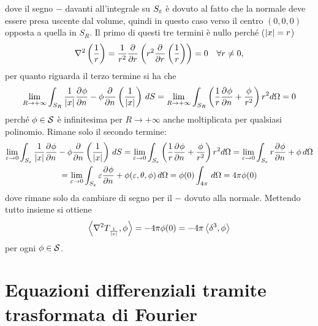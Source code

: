 dove il segno $ - $ davanti all'integrale su $ S_\varepsilon $ è dovuto al fatto che la normale deve essere presa uscente dal volume, quindi in questo caso verso 
il centro $ (0,0,0) $ opposta a quella in $ S_R $. Il primo di questi tre termini è nullo perché ($ \left|{x}\right| = r $)
\begin{align}
  \nabla^2\left( \frac1r \right) = \frac1{r^2} \frac{\partial^{} {}}{\partial {r}^{}} \left( r^2 \frac{\partial^{} {}}{\partial {r}^{}}\left( \frac1r \right)\right) = 0 \quad \forall r \neq 0,
\end{align}
per quanto riguarda il terzo termine si ha che 
\begin{align}
  \lim_{R \to +\infty} \int_{S_R} \frac1{\abs{x}} \der{\phi}{{n}} - \phi \der{}{{n}}\left( \frac1{\abs{x}} \right) \,dS
  =  \lim_{R \to +\infty} \int_{S_R}\left( \frac1r \der{\phi}{{n}} + \frac{\phi}{r^2} \right) r^2 d\Omega = 0
\end{align} 
perché $ \phi \in \S $  è infinitesima per $ R\to+\infty $ anche moltiplicata per qualsiasi polinomio.
Rimane solo il secondo termine:
\begin{gather}
  \lim_{\eps \to 0} \int_{S_\eps} \frac1{\abs{x}} \der{\phi}{{n}} - \phi \der{}{{n}}\left( \frac1{\abs{x}} \right) \,dS
  = \lim_{\eps \to 0} \int_{S_\eps} \left(  \frac1r \der{\phi}{{n}} + \frac{\phi}{r^2} \right) r^2 d\Omega 
  = \lim_{\eps \to 0} \int_{S_\eps} r \der{\phi}{{n}} + \phi\, d\Omega 
  \\
  = \lim_{\eps \to 0} \int_{S_\eps} \eps \der{\phi}{{n}} + \phi(\eps, \theta, \varphi) \, d\Omega = \phi(0) \int_{4\pi} \,d\Omega = 4\pi \phi(0)
\end{gather}
dove rimane solo da cambiare di segno per il $ - $ dovuto alla normale. Mettendo tutto insieme si ottiene 
\begin{align}
  \sca{\nabla^2 T_{\frac1{\abs{x}}}, \phi} = -4\pi \phi(0) = -4\pi \sca{\delta^3, \phi} 
\end{align}
per ogni $ \phi \in \S $.

\section{Equazioni differenziali tramite trasformata di Fourier}


